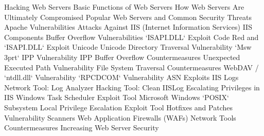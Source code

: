 Hacking Web Servers
	Basic Functions of Web Servers
	How Web Servers Are Ultimately Compromised
	Popular Web Servers and Common Security Threats
	Apache Vulnerabilities
	Attacks Against IIS (Internet Information Services)
		IIS Components
	Buffer Overflow Vulnerabilities
	`ISAPI.DLL` Exploit
	Code Red and `ISAPI.DLL` Exploit
	Unicode
		Unicode Directory Traversal Vulnerability
	`Msw 3prt` IPP Vulnerability
	IPP Buffer Overflow
	Countermeasures
	Unexpected Executed Path Vulnerability
	File System Traversal Countermeasures
	WebDAV / `ntdll.dll` Vulnerability
	`RPCDCOM` Vulnerability
	ASN Exploits
	IIS Logs
	Network Tool: Log Analyzer
	Hacking Tool: Clean IISLog
	Escalating Privileges in IIS
	Windows Task Scheduler Exploit Tool
	Microsoft Windows `POSIX`
	Subsystem Local Privilege Escalation Exploit Tool
	Hotfixes and Patches
	Vulnerability Scanners
	Web Application Firewalls (WAFs)
	Network Tools
	Countermeasures
	Increasing Web Server Security
	